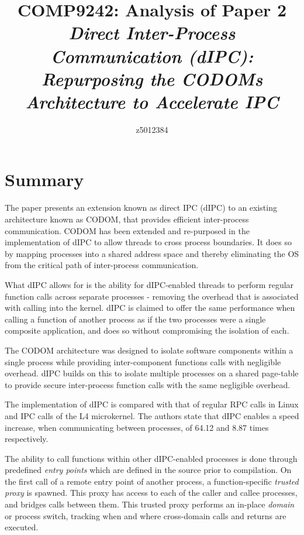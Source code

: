 \documentclass{article}
\begin{document}
\title{COMP9242: Analysis of Paper 2 \\ \vspace{0.75cm} \large \textit{Direct Inter-Process Communication (dIPC): Repurposing the CODOMs Architecture to Accelerate IPC}}

\author{z5012384}

\maketitle

\section*{Summary}
The paper presents an extension known as direct IPC (dIPC) to an existing architecture known as CODOM, that provides efficient inter-process communication. CODOM has been extended and re-purposed in the implementation of dIPC to allow threads to cross process boundaries. It does so by mapping processes into a shared address space and thereby eliminating the OS from the critical path of inter-process communication.

What dIPC allows for is the ability for dIPC-enabled threads to perform regular function calls across separate processes - removing the overhead that is associated with calling into the kernel. dIPC is claimed to offer the same performance when calling a function of another process as if the two processes were a single composite application, and does so without compromising the isolation of each.

The CODOM architecture was designed to isolate software components within a single process while providing inter-component functions calls  with negligible overhead. dIPC builds on this to isolate multiple processes on a shared page-table to provide secure inter-process function calls with the same negligible overhead.

The implementation of dIPC is compared with that of regular RPC calls in Linux and IPC calls of the L4 microkernel. The authors state that dIPC enables a speed increase, when communicating between processes, of 64.12 and 8.87 times respectively. 

The ability to call functions within other dIPC-enabled processes is done through predefined \textit{entry points} which are defined in the source prior to compilation. On the first call of a remote entry point of another process, a function-specific \textit{trusted proxy} is spawned. This proxy has access to each of the caller and callee processes, and bridges calls between them. This trusted proxy performs an in-place \textit{domain} or process switch, tracking  when and where cross-domain calls and returns are executed.
\end{document}

